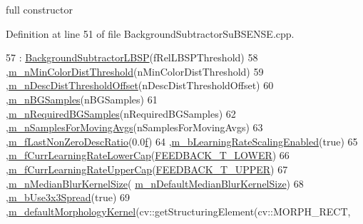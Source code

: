 full constructor 



Definition at line 51 of file Background\+Subtractor\+Su\+B\+S\+E\+N\+S\+E.\+cpp.


\begin{DoxyCode}
57     :    \mbox{\hyperlink{class_background_subtractor_l_b_s_p_a5f7f42ea5c9697479cbe237b49ca6ae9}{BackgroundSubtractorLBSP}}(fRelLBSPThreshold)
58         ,\mbox{\hyperlink{class_background_subtractor_su_b_s_e_n_s_e_ae0ebf701652a66bbdb0472d6f091e34d}{m\_nMinColorDistThreshold}}(nMinColorDistThreshold)
59         ,\mbox{\hyperlink{class_background_subtractor_su_b_s_e_n_s_e_a79fe0f1657cd613b975d62f73e749ec2}{m\_nDescDistThresholdOffset}}(nDescDistThresholdOffset)
60         ,\mbox{\hyperlink{class_background_subtractor_su_b_s_e_n_s_e_ad783b71b5b942c4018d27cf38b7d7225}{m\_nBGSamples}}(nBGSamples)
61         ,\mbox{\hyperlink{class_background_subtractor_su_b_s_e_n_s_e_aca07c4307021623f9055832506cad1d6}{m\_nRequiredBGSamples}}(nRequiredBGSamples)
62         ,\mbox{\hyperlink{class_background_subtractor_su_b_s_e_n_s_e_acd112ccb067f76e370400565fa09ee49}{m\_nSamplesForMovingAvgs}}(nSamplesForMovingAvgs)
63         ,\mbox{\hyperlink{class_background_subtractor_su_b_s_e_n_s_e_a4231d025a90be64a703f3f0aff1345c8}{m\_fLastNonZeroDescRatio}}(0.0\mbox{\hyperlink{rings_8cpp_a77369fc4d5326a16d2c603e032023528}{f}})
64         ,\mbox{\hyperlink{class_background_subtractor_su_b_s_e_n_s_e_afca07a4c7edca7761e55dfbdf6da4263}{m\_bLearningRateScalingEnabled}}(\textcolor{keyword}{true})
65         ,\mbox{\hyperlink{class_background_subtractor_su_b_s_e_n_s_e_a57fdd29e43afc163233e55f9a7cd9f37}{m\_fCurrLearningRateLowerCap}}(\mbox{\hyperlink{_background_subtractor_su_b_s_e_n_s_e_8cpp_a6975332215c62c3172a76af852bc5566}{FEEDBACK\_T\_LOWER}})
66         ,\mbox{\hyperlink{class_background_subtractor_su_b_s_e_n_s_e_a44ba1a1ed365c5829baa517ce9f27508}{m\_fCurrLearningRateUpperCap}}(\mbox{\hyperlink{_background_subtractor_su_b_s_e_n_s_e_8cpp_a23bd980dc8c9bbffe3f27b44fa983f9c}{FEEDBACK\_T\_UPPER}})
67         ,\mbox{\hyperlink{class_background_subtractor_su_b_s_e_n_s_e_a796120fecb11f00914925e14065ee5ab}{m\_nMedianBlurKernelSize}}(
      \mbox{\hyperlink{class_background_subtractor_l_b_s_p_a2585fe6e41e10af6da3e325dc20fe7f1}{m\_nDefaultMedianBlurKernelSize}})
68         ,\mbox{\hyperlink{class_background_subtractor_su_b_s_e_n_s_e_a1e2e28840e7ca373282607db81b49e12}{m\_bUse3x3Spread}}(\textcolor{keyword}{true})
69         ,\mbox{\hyperlink{class_background_subtractor_su_b_s_e_n_s_e_ae360b93378aa04b34aebc23b5f6e6714}{m\_defaultMorphologyKernel}}(cv::getStructuringElement(cv::MORPH\_RECT, 

\end{DoxyCode}
